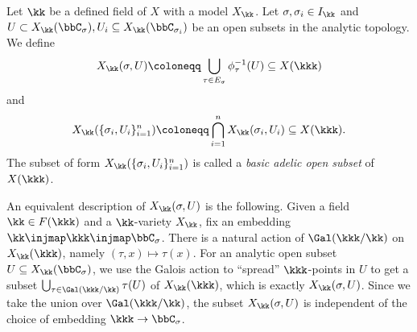     \begin{definition}\label{def:basic_adelic_subset}
        Let \(\kk\) be a defined field of \(X\) with a model \(X_\kk\).
        Let \(\sigma,\sigma_i \in I_\kk\) and \(U \subset X_{\kk}(\bbC_\sigma), U_i \subseteq X_{\kk}(\bbC_{\sigma_i})\) be an open subsets in the analytic topology.
        We define
        \[ X_\kk(\sigma,U) \coloneqq \bigcup_{\tau\in E_\sigma} \phi_\tau^{-1}(U) \subseteq X(\kkk) \]
        and
        \[ X_\kk(\{\sigma_i,U_i\}_{i=1}^n) \coloneqq \bigcap_{i=1}^n X_\kk(\sigma_i,U_i) \subseteq X(\kkk). \]
        The subset of form \(X_\kk(\{\sigma_i,U_i\}_{i=1}^n)\) is called a \emph{basic adelic open subset} of \(X(\kkk)\).
    \end{definition}

    An equivalent description of \(X_\kk(\sigma,U)\) is the following.
    Given a field \(\kk \in F(\kkk)\) and a \(\kk\)-variety \(X_\kk\), fix an embedding \(\kk \injmap \kkk \injmap \bbC_\sigma\).
    There is a natural action of \(\Gal(\kkk/\kk)\) on \(X_\kk(\kkk)\), namely \((\tau,x) \mapsto \tau(x)\).
    For an analytic open subset \(U \subseteq X_{\kk}(\bbC_\sigma)\), we use the Galois action to ``spread'' \(\kkk\)-points in \(U\) to get a subset \(\bigcup_{\tau \in \Gal(\kkk/\kk)} \tau(U)\) of \(X_\kk(\kkk)\), which is exactly \(X_\kk(\sigma,U)\).
    Since we take the union over \(\Gal(\kkk/\kk)\), the subset \(X_\kk(\sigma,U)\) is independent of the choice of embedding \(\kkk \to \bbC_\sigma\).

